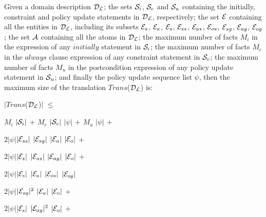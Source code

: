 \documentclass[global,twocolumn,final]{svjour}
\newenvironment{vtheorem}[1]
  {\begin{theorem}[#1]\hspace{0.25em}}
  {\end{theorem}}
\newenvironment{vquote}
  {\begin{list}{}{\leftmargin 1em}\item[]}
  {\end{list}}
\begin{document}
        \begin{vtheorem}{Translation Size}
          \label{the-size}
          Given a domain description ${\cal D_{L}}$; the sets ${\cal S}_{i}$,
          ${\cal S}_{c}$ and ${\cal S}_{u}$ containing the initially,
          constraint and policy update statements in ${\cal D_{L}}$,
          respectively; the set ${\cal E}$ containing all the entities in
          ${\cal D_{L}}$, including its subsets ${\cal E}_{s}$, ${\cal E}_{a}$,
          ${\cal E}_{s}$, ${\cal E}_{ss}$, ${\cal E}_{as}$, ${\cal E}_{os}$,
          ${\cal E}_{sg}$, ${\cal E}_{ag}$, ${\cal E}_{og}$; the set ${\cal A}$
          containing all the atoms in ${\cal D_{L}}$; the maximum number
          of facts $M_{i}$ in the expression of any $initially$ statement in
          ${\cal S}_{i}$; the maximum number of facts $M_{c}$ in the $always$
          clause expression of any constraint statement in ${\cal S}_{c}$;
          the maximum number of facts $M_{u}$ in the postcondition expression
          of any policy update statement in ${\cal S}_{u}$; and finally the
          policy update sequence list $\psi$, then the maximum size of the
          translation $Trans$(${\cal D_{L}}$) is:

         \begin{vquote}
            $|$$Trans$(${\cal D_{L}}$)$|$ $\leq$

            \hspace{1em}
            $M_{i}$ $|{\cal S}_{i}|$ +
            $M_{c}$ $|{\cal S}_{c}|$ $|\psi|$ +
            $M_{u}$ $|\psi|$ +

            \hspace{1em}
            $2|\psi|$$|{\cal E}_{ss}|$ $|{\cal E}_{sg}|$ $|{\cal E}_{a}|$ $|{\cal E}_{o}|$ +

            \hspace{1em}
            $2|\psi|$$|{\cal E}_{s}|$ $|{\cal E}_{as}|$ $|{\cal E}_{ag}|$ $|{\cal E}_{o}|$ +

            \hspace{1em}
            $2|\psi|$$|{\cal E}_{s}|$ $|{\cal E}_{a}|$ $|{\cal E}_{os}|$ $|{\cal E}_{og}|$

            \hspace{1em}
            $2|\psi|$$|{\cal E}_{sg}|^{2}$ $|{\cal E}_{a}|$ $|{\cal E}_{o}|$ +

            \hspace{1em}
            $2|\psi|$$|{\cal E}_{s}|$ $|{\cal E}_{ag}|^{2}$ $|{\cal E}_{o}|$ +


\end{vquote}
\end{vtheorem}
\end{document}
